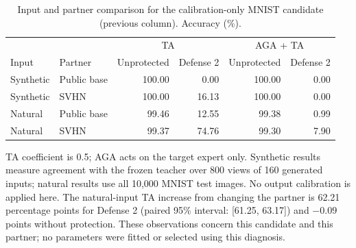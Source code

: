 \begin{table}[t]
\centering\small
\caption{Input and partner comparison for the calibration-only MNIST candidate (previous column). Accuracy (\%).}
\label{tab:calibrated-objective-transfer}
\begin{tabular}{llrrrr}
\toprule
 & & \multicolumn{2}{c}{TA} & \multicolumn{2}{c}{AGA + TA} \\
Input & Partner & Unprotected & Defense 2 & Unprotected & Defense 2 \\
\midrule
Synthetic & Public base & 100.00 & 0.00 & 100.00 & 0.00 \\
Synthetic & SVHN & 100.00 & 16.13 & 100.00 & 0.00 \\
Natural & Public base & 99.46 & 12.55 & 99.38 & 0.99 \\
Natural & SVHN & 99.37 & 74.76 & 99.30 & 7.90 \\
\bottomrule
\end{tabular}
\par\smallskip
\begin{minipage}{\textwidth}\footnotesize
TA coefficient is 0.5; AGA acts on the target expert only. Synthetic results measure agreement with the frozen teacher over 800 views of 160 generated inputs; natural results use all 10,000 MNIST test images. No output calibration is applied here. The natural-input TA increase from changing the partner is 62.21 percentage points for Defense 2 (paired 95\% interval: [61.25, 63.17]) and $-0.09$ points without protection. These observations concern this candidate and this partner; no parameters were fitted or selected using this diagnosis.
\end{minipage}
\end{table}

